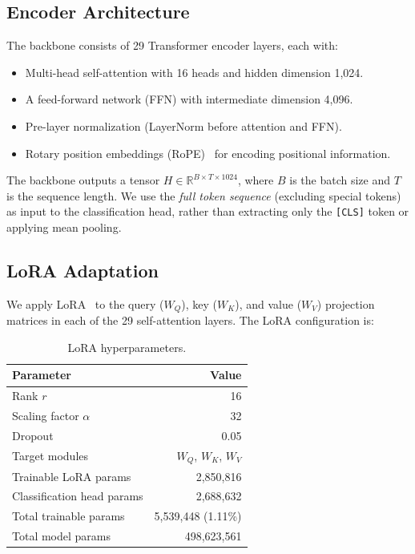 \subsection{Encoder Architecture}

The backbone consists of 29 Transformer encoder layers, each with:
\begin{itemize}
    \item Multi-head self-attention with 16 heads and hidden dimension 1,024.
    \item A feed-forward network (FFN) with intermediate dimension 4,096.
    \item Pre-layer normalization (LayerNorm before attention and FFN).
    \item Rotary position embeddings (RoPE)~\cite{Su2024} for encoding positional information.
\end{itemize}

The backbone outputs a tensor $H \in \mathbb{R}^{B \times T \times 1024}$, where $B$ is the batch size and $T$ is the sequence length. We use the \emph{full token sequence} (excluding special tokens) as input to the classification head, rather than extracting only the \texttt{[CLS]} token or applying mean pooling.

\subsection{LoRA Adaptation}
\label{sec:method-lora}

We apply LoRA~\cite{Hu2022} to the query ($W_Q$), key ($W_K$), and value ($W_V$) projection matrices in each of the 29 self-attention layers. The LoRA configuration is:

\begin{table}[htbp]
    \centering
    \caption{LoRA hyperparameters.}
    \label{tab:lora-config}
    \begin{tabular}{lr}
        \toprule
        \textbf{Parameter} & \textbf{Value} \\
        \midrule
        Rank $r$ & 16 \\
        Scaling factor $\alpha$ & 32 \\
        Dropout & 0.05 \\
        Target modules & $W_Q$, $W_K$, $W_V$ \\
        \midrule
        Trainable LoRA params & 2,850,816 \\
        Classification head params & 2,688,632 \\
        Total trainable params & 5,539,448 (1.11\%) \\
        Total model params & 498,623,561 \\
        \bottomrule
    \end{tabular}
\end{table}


